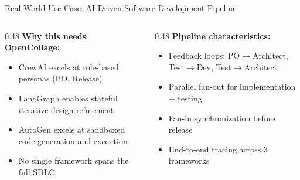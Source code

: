 \begin{frame}{\fontsize{10}{12}\selectfont Real-World Use Case: AI-Driven Software Development Pipeline}
\begin{center}
  \end{center}

  \vspace{-0.2cm}

  \fontsize{6}{7}\selectfont
  \begin{columns}[T]
    \begin{column}{0.48\textwidth}
      \textbf{Why this needs OpenCollage:}
      \begin{itemize}
        \item CrewAI excels at role-based personas (PO, Release)
        \item LangGraph enables stateful iterative design refinement
        \item AutoGen excels at sandboxed code generation and execution
        \item No single framework spans the full SDLC
      \end{itemize}
    \end{column}
    \begin{column}{0.48\textwidth}
      \textbf{Pipeline characteristics:}
      \begin{itemize}
        \item Feedback loops: PO$\leftrightarrow$Architect, Test$\rightarrow$Dev, Test$\rightarrow$Architect
        \item Parallel fan-out for implementation + testing
        \item Fan-in synchronization before release
        \item End-to-end tracing across 3 frameworks
      \end{itemize}
    \end{column}
  \end{columns}
\end{frame}

